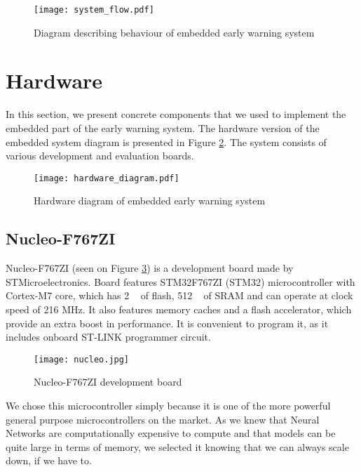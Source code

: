 \begin{figure}[ht]
        \centering
        \texttt{[image: system\_flow.pdf]} 
        \caption{ Diagram describing behaviour of embedded early warning system} 
        \label{system_flow}
\end{figure}


\section{ Hardware}

In this section, we present concrete components that we used to implement the embedded part of the early warning system.
The hardware version of the embedded system diagram is presented in Figure \ref{hardware_diagram}.
The system consists of various development and evaluation boards.

\begin{figure}[ht]
        \centering
        \texttt{[image: hardware\_diagram.pdf]} 
        \caption{ Hardware diagram of embedded early warning system} 
        \label{hardware_diagram}
\end{figure}


\subsection{ Nucleo-F767ZI}

Nucleo-F767ZI (seen on Figure \ref{nucleo}) is a development board made by STMicroelectronics.
Board features STM32F767ZI (STM32) microcontroller with Cortex-M7 core, which has 2 \si{\mega\byte} of flash, 512 \si{\kilo\byte} of SRAM and can operate at clock speed of 216 \si{\mega\hertz}.
It also features memory caches and a flash accelerator, which provide an extra boost in performance.
It is convenient to program it, as it includes onboard ST-LINK programmer circuit.

\begin{figure}[ht]
        \centering
        \texttt{[image: nucleo.jpg]} 
        \caption{ Nucleo-F767ZI development board} 
        \label{nucleo}
\end{figure}

We chose this microcontroller simply because it is one of the more powerful general purpose microcontrollers on the market.
As we knew that Neural Networks are computationally expensive to compute and that models can be quite large in terms of memory, we selected it knowing that we can always scale down, if we have to.


